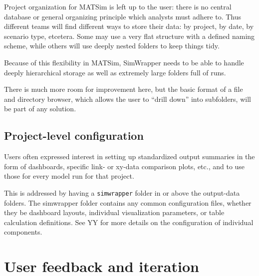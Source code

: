 Project organization for MATSim is left up to the user: there is no
central database or general organizing principle which analysts must
adhere to. Thus different teams will find different ways to store their
data: by project, by date, by scenario type, etcetera. Some may use a
very flat structure with a defined naming scheme, while others will use
deeply nested folders to keep things tidy.

Because of this flexibility in MATSim, SimWrapper needs to be able to
handle deeply hierarchical storage as well as extremely large folders
full of runs.

There is much more room for improvement here, but the basic format of a
file and directory browser, which allows the user to ``drill down'' into
subfolders, will be part of any solution.



\hypertarget{project-level-configuration}{%
\subsection{Project-level
configuration}\label{project-level-configuration}}

Users often expressed interest in setting up standardized output
summaries in the form of dashboards, specific link- or xy-data
comparison plots, etc., and to use those for every model run for that
project.

This is addressed by having a \texttt{simwrapper} folder in or above the
output-data folders. The simwrapper folder contains any common
configuration files, whether they be dashboard layouts, individual
visualization parameters, or table calculation definitions. See YY for
more details on the configuration of individual components.


\hypertarget{user-feedback-and-iteration}{%
\section{User feedback and
iteration}\label{simwrapper-user-feedback}}

